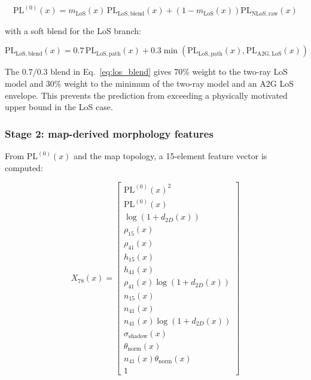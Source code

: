 \documentclass[11pt,a4paper]{article}
\begin{document}
\begin{equation}
\mathrm{PL}^{(0)}(x)
=
m_{\mathrm{LoS}}(x)\,\mathrm{PL}_{\mathrm{LoS,blend}}(x)
+
\left(1-m_{\mathrm{LoS}}(x)\right)\mathrm{PL}_{\mathrm{NLoS,raw}}(x)
\label{eq:pl0}
\end{equation}

with a soft blend for the LoS branch:

\begin{equation}
\mathrm{PL}_{\mathrm{LoS,blend}}(x)
=
0.7\,\mathrm{PL}_{\mathrm{LoS,path}}(x)
+0.3\min\left(\mathrm{PL}_{\mathrm{LoS,path}}(x), \mathrm{PL}_{\mathrm{A2G,LoS}}(x)\right)
\label{eq:los_blend}
\end{equation}

The $0.7/0.3$ blend in Eq.~\eqref{eq:los_blend} gives 70\% weight to the
two-ray LoS model and 30\% weight to the minimum of the two-ray model and an
A2G LoS envelope. This prevents the prediction from exceeding a physically
motivated upper bound in the LoS case.

\subsubsection{Stage 2: map-derived morphology features}

From $\mathrm{PL}^{(0)}(x)$ and the map topology, a 15-element feature
vector is computed:

\begin{equation}
X_{78}(x)
=
\begin{bmatrix}
\mathrm{PL}^{(0)}(x)^2 \\
\mathrm{PL}^{(0)}(x) \\
\log(1+d_{2D}(x)) \\
\rho_{15}(x) \\
\rho_{41}(x) \\
h_{15}(x) \\
h_{41}(x) \\
\rho_{41}(x)\log(1+d_{2D}(x)) \\
n_{15}(x) \\
n_{41}(x) \\
n_{41}(x)\log(1+d_{2D}(x)) \\
\sigma_{\mathrm{shadow}}(x) \\
\theta_{\mathrm{norm}}(x) \\
n_{41}(x)\theta_{\mathrm{norm}}(x) \\
1
\end{bmatrix}
\label{eq:x78}
\end{equation}
\end{document}
